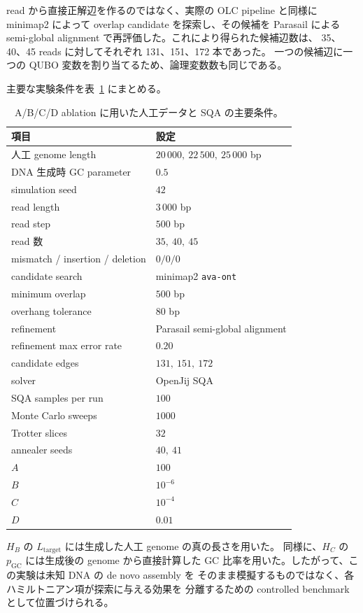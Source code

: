 \documentclass[a4j,10pt]{ujarticle}
\begin{document}
read から直接正解辺を作るのではなく、実際の OLC pipeline と同様に
minimap2 によって overlap candidate を探索し、その候補を Parasail による
semi-global alignment で再評価した。これにより得られた候補辺数は、
35、40、45 reads に対してそれぞれ 131、151、172 本であった。
一つの候補辺に一つの QUBO 変数を割り当てるため、論理変数数も同じである。

主要な実験条件を表~\ref{tab:abcd_setup} にまとめる。

\begin{table}[t]
\centering
\caption{A/B/C/D ablation に用いた人工データと SQA の主要条件。}
\label{tab:abcd_setup}
\begin{tabular}{ll}
\hline
項目 & 設定 \\
\hline
人工 genome length & $20\,000,\ 22\,500,\ 25\,000$ bp \\
DNA 生成時 GC parameter & $0.5$ \\
simulation seed & $42$ \\
read length & $3\,000$ bp \\
read step & $500$ bp \\
read 数 & $35,\ 40,\ 45$ \\
mismatch / insertion / deletion & $0/0/0$ \\
candidate search & minimap2 \texttt{ava-ont} \\
minimum overlap & $500$ bp \\
overhang tolerance & $80$ bp \\
refinement & Parasail semi-global alignment \\
refinement max error rate & $0.20$ \\
candidate edges & $131,\ 151,\ 172$ \\
solver & OpenJij SQA \\
SQA samples per run & $100$ \\
Monte Carlo sweeps & $1000$ \\
Trotter slices & $32$ \\
annealer seeds & $40,\ 41$ \\
$A$ & $100$ \\
$B$ & $10^{-6}$ \\
$C$ & $10^{-4}$ \\
$D$ & $0.01$ \\
\hline
\end{tabular}
\end{table}

$H_B$ の $L_{\mathrm{target}}$ には生成した人工 genome の真の長さを用いた。
同様に、$H_C$ の $p_{\mathrm{GC}}$ には生成後の genome から直接計算した
GC 比率を用いた。したがって、この実験は未知 DNA の de novo assembly を
そのまま模擬するものではなく、各ハミルトニアン項が探索に与える効果を
分離するための controlled benchmark として位置づけられる。
\end{document}
